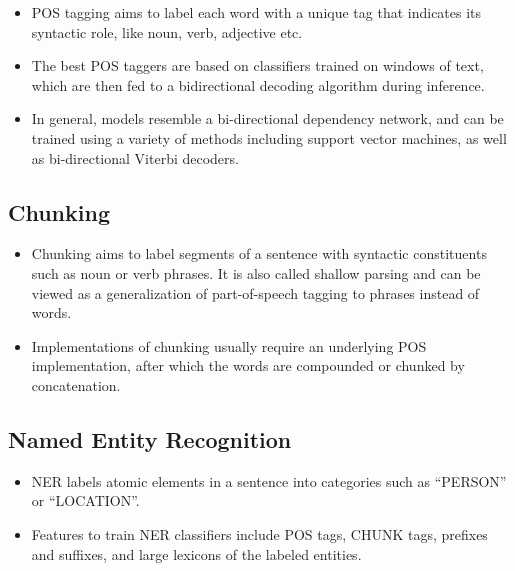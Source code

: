 \documentclass[11pt,a4paper]{article}
\begin{document}
    \begin{itemize}
      \item
      POS tagging aims to label each word with a unique tag that indicates its syntactic role, like noun, verb, adjective etc.
      \item
      The best POS taggers are based on classifiers trained on windows of text, which are then fed to a bidirectional decoding algorithm during inference.
      \item
      In general, models resemble a bi-directional dependency network, and can be trained using a variety of methods including support vector machines, as well as bi-directional Viterbi decoders.
    \end{itemize}


  \subsection{Chunking} %
  \label{sub:chunking}

    \begin{itemize}
      \item
      Chunking aims to label segments of a sentence with syntactic constituents such as noun or verb phrases. It is also called shallow parsing and can be viewed as a generalization of part-of-speech tagging to phrases instead of words.
      \item
      Implementations of chunking usually require an underlying POS implementation, after which the words are compounded or chunked by concatenation.
    \end{itemize}


  \subsection{Named Entity Recognition} %
  \label{sub:named_entity_recognition}

    \begin{itemize}
      \item
      NER labels atomic elements in a sentence into categories such as “PERSON” or “LOCATION”.
      \item
      Features to train NER classifiers include POS tags, CHUNK tags, prefixes and suffixes, and large lexicons of the labeled entities.
    \end{itemize}
\end{document}
